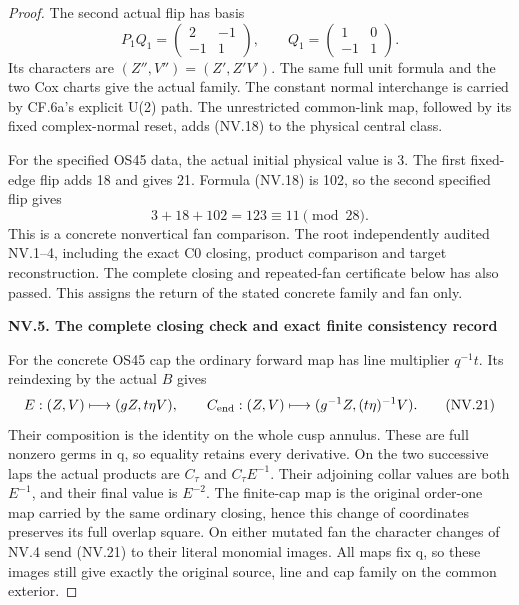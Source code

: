 \begin{proof}
The second actual flip has basis
\[
 P_1Q_1=\begin{pmatrix}2&-1\\-1&1\end{pmatrix},\qquad
 Q_1=\begin{pmatrix}1&0\\-1&1\end{pmatrix}.
\tag{NV.19}
\]
Its characters are \((Z'',V'')=(Z',Z'V')\). The same full unit
formula and the two Cox charts give the actual family. The constant
normal interchange is carried by CF.6a's explicit U(2) path. The
unrestricted common-link map, followed by its fixed complex-normal
reset, adds (NV.18) to the physical central class.

For the specified OS45 data, the actual initial physical value is 3.
The first fixed-edge flip adds 18 and gives 21. Formula (NV.18) is 102,
so the second specified flip gives
\[
               3+18+102=123\equiv11\pmod{28}.
\tag{NV.20}
\]
This is a concrete nonvertical fan comparison. The root independently audited NV.1--4, including the exact C0 closing,
product comparison and target reconstruction. The complete closing
and repeated-fan certificate below has also passed. This assigns the
return of the stated concrete family and fan only.

\par

\medskip\noindent\textbf{NV.5. The complete closing check and exact finite consistency record}

\par\nobreak

For the concrete OS45 cap the ordinary forward map has line multiplier
\(q^{-1}t\). Its reindexing by the actual \(B\) gives
\[
 E:(Z,V)\longmapsto(gZ,t\eta V),\qquad
 C_{\rm end}:(Z,V)\longmapsto(g^{-1}Z,(t\eta)^{-1}V).
\tag{NV.21}
\]
Their composition is the identity on the whole cusp annulus. These
are full nonzero germs in q, so equality retains every derivative.
On the two successive laps the actual products are \(C_\tau\) and
\(C_\tau E^{-1}\). Their adjoining collar values are both
\(E^{-1}\), and their final value is \(E^{-2}\). The finite-cap
map is the original order-one map carried by the same ordinary
closing, hence this change of coordinates preserves its full overlap
square. On either mutated fan the character changes of NV.4 send
(NV.21) to their literal monomial images. All maps fix q, so these
images still give exactly the original source, line and cap family
on the common exterior.


\end{proof}
